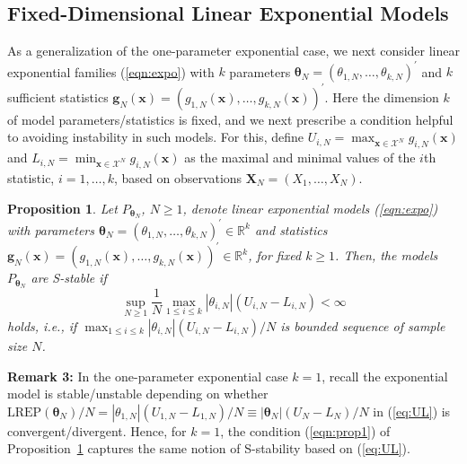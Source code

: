 \documentclass[12pt]{article}
\theoremstyle{definition}
\newcommand{\REP}{\mathrm{LREP}}
\begin{document}
 \subsection{Fixed-Dimensional Linear Exponential Models}
  As a generalization of the one-parameter exponential case, we next consider  linear exponential families  (\ref{eqn:expo}) with $k$
   parameters $\boldsymbol \theta_N = (\theta_{1,N},\ldots,\theta_{k,N})^\prime$   and $k$ sufficient statistics
   $\boldsymbol g_N(\boldsymbol x) = (g_{1,N}(\boldsymbol x),\ldots, g_{k,N}(\boldsymbol x))^\prime$.  Here the dimension $k$ of model  parameters/statistics is fixed, and we next prescribe a condition helpful to avoiding instability in such models.
For this, define  $U_{i,N}=\max_{\boldsymbol x \in\mathcal{X}^N} g_{i,N}(\boldsymbol x)$ and $L_{i,N}=\min_{\boldsymbol x \in\mathcal{X}^N} g_{i,N}(\boldsymbol x)$ as the maximal and minimal values of the $i$th statistic, $i=1,\ldots,k$, based on observations $\boldsymbol X_N=(X_1,\ldots,X_N)$.
\newtheorem{proposition1}{Proposition}

  \begin{proposition1}
  \label{prop1} {\it Let $P_{\boldsymbol \theta_N}$, $N \geq 1$,  denote   linear exponential models   (\ref{eqn:expo})
  with   parameters $\boldsymbol \theta_N = (\theta_{1,N},\ldots,\theta_{k,N})^\prime \in \mathbb{R}^k$ and statistics  $\boldsymbol g_N(\boldsymbol x) = (g_{1,N}(\boldsymbol x),\ldots, g_{k,N}(\boldsymbol x))^\prime \in \mathbb{R}^k$, for fixed $k \geq 1$.  Then, the models
  $P_{\boldsymbol \theta_N}$ are {\rm S-stable}   if
  \begin{equation}
  \label{eqn:prop1}
  \sup_{N \geq 1}\frac{1}{N} \max_{1 \leq i \leq k } |\theta_{i,N}|(U_{i,N}-L_{i,N})<\infty
  \end{equation}
  holds, i.e.,    if $\max_{1 \leq i \leq k } |\theta_{i,N}|(U_{i,N}-L_{i,N})/N $ is bounded sequence of sample size $N$.}
\end{proposition1}
\noindent\textbf{Remark 3:}  In the one-parameter exponential case $k=1$, recall the exponential model is stable/unstable depending on whether $\REP(\boldsymbol \theta_N)/N = |\theta_{1,N}|(U_{1,N}-L_{1,N})/N \equiv |\boldsymbol \theta_{N}|(U_{N}-L_{N})/N$ in (\ref{eq:UL}) is  convergent/divergent.  Hence, for $k=1$, the condition (\ref{eqn:prop1}) of Proposition~\ref{prop1} captures the same notion of S-stability based on (\ref{eq:UL}).  \\
\end{document}
